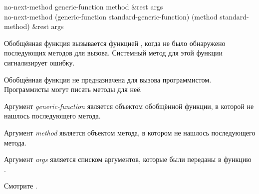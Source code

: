 \begin{defun}
no-next-method generic-function method &rest args \\
no-next-method (generic-function standard-generic-function)
    (method standard-method) &rest args

Обобщённая функция  вызывается функцией
, когда не было обнаружено последующих методов для
вызова. Системный метод для этой функции сигнализирует ошибку.

Обобщённая функция  не предназначена для вызова
программистом. Программисты могут писать методы для неё.

Аргумент \emph{generic-function} является объектом обобщённой функции, в которой
не нашлось последующего метода.

Аргумент \emph{method} является объектом метода, в котором
не нашлось последующего метода.

Аргумент \emph{args} является списком аргументов, которые были
переданы в функцию .

Смотрите .
\end{defun}


